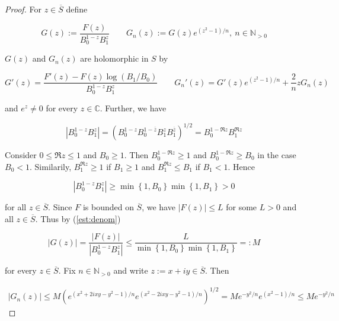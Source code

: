 \begin{proof}
For $z \in \overline{S}$ define 

\begin{equation*}
	G(z) := \frac{F(z)}{B_0^{1 - z}B_1^z} \qquad G_n(z) := G(z) e^{\left(z^2 - 1\right)/n},~n \in\mathbb{N}_{>0}
\end{equation*}

$G(z)$ and $G_n(z)$ are holomorphic in $S$ by
	
\begin{equation*}
	G'(z) = \frac{F'(z) - F(z)\log\left( B_1/B_0 \right)}{B_0^{1 - z}B_1^z} \qquad G_n'(z) = G'(z)e^{\left( z^2 - 1 \right)/n} + \frac{2}{n}zG_n(z)	
\end{equation*}

\noindent and $e^z \neq 0$ for every $z \in \mathbb{C}$. Further, we have

\begin{equation*}
		\left| B_0^{1 - z}B_1^z \right| = \left(B_0^{1 - z}B_0^{1 - \overline{z}} B_1^z B_1^{\overline{z}}\right)^{1/2} =  B_0^{1 -\Re z}B_1^{\Re z}
\end{equation*}

Consider $0 \leq \Re z \leq 1$ and $B_0 \geq 1$. Then $B_0^{1 - \Re z} \geq 1$ and $B_0^{1 - \Re z } \geq B_0$ in the case $B_0 < 1$. Similarily, $B_1^{\Re z} \geq 1$ if $B_1 \geq 1$ and $B_1^{\Re z} \leq B_1$ if $B_1 < 1$. Hence 

\begin{equation}
	\left| B_0^{1 - z}B_1^z \right| \geq \min\left\{1,B_0\right\}\min\left\{1,B_1\right\} > 0
	\label{est:denom}
\end{equation}

\noindent for all $z \in \overline{S}$. Since $F$ is bounded on $\overline{S}$, we have $\left| F(z) \right| \leq L$ for some $L > 0$ and all $z \in \overline{S}$. Thus by (\ref{est:denom})

\begin{equation*}
	\left| G(z)\right| = \frac{\left| F(z)\right|}{\left| B_0^{1 - z}B_1^z \right|} \leq \frac{L}{\min\left\{1,B_0\right\}\min\left\{1,B_1\right\}} =: M
\end{equation*}

\noindent for every $z \in \overline{S}$. Fix $n \in \mathbb{N}_{>0}$ and write $z := x + iy \in \overline{S}$. Then

\begin{gather*}
	\left| G_n(z)\right| \leq M \left(e^{\left(x^2 + 2ixy -y^2 - 1\right)/n} e^{\left(x^2 - 2ixy -y^2 - 1\right)/n}\right)^{1/2}= M e^{-y^2/n}e^{\left(x^2 - 1\right)/n} \leq Me^{-y^2/n}
\end{gather*}


\end{proof}
